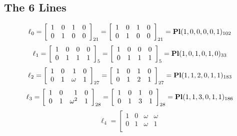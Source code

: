 \documentclass{article}
\begin{document}
{\subsection*{The 6 Lines}
$$
\ell_{0} = 
\left[
\begin{array}{*{4}{r}}
1 & 0 & 1 & 0\\
0 & 1 & 0 & 0\\
\end{array}
\right]
_{21}
=
\left[
\begin{array}{*{4}c}
1  & 0  & 1  & 0\\
0  & 1  & 0  & 0\\
\end{array}
\right]_{21}
={\rm\bf Pl}(1,0,0,0,0,1 )_{102}$$
$$
\ell_{1} = 
\left[
\begin{array}{*{4}{r}}
1 & 0 & 0 & 0\\
0 & 1 & 1 & 1\\
\end{array}
\right]
_{5}
=
\left[
\begin{array}{*{4}c}
1  & 0  & 0  & 0\\
0  & 1  & 1  & 1\\
\end{array}
\right]_{5}
={\rm\bf Pl}(1,0,1,0,1,0 )_{33}$$
$$
\ell_{2} = 
\left[
\begin{array}{*{4}{r}}
1 & 0 & 1 & 0\\
0 & 1 & \omega  & 1\\
\end{array}
\right]
_{27}
=
\left[
\begin{array}{*{4}c}
1  & 0  & 1  & 0\\
0  & 1  & 2  & 1\\
\end{array}
\right]_{27}
={\rm\bf Pl}(1,1,2,0,1,1 )_{183}$$
$$
\ell_{3} = 
\left[
\begin{array}{*{4}{r}}
1 & 0 & 1 & 0\\
0 & 1 & \omega^{2} & 1\\
\end{array}
\right]
_{28}
=
\left[
\begin{array}{*{4}c}
1  & 0  & 1  & 0\\
0  & 1  & 3  & 1\\
\end{array}
\right]_{28}
={\rm\bf Pl}(1,1,3,0,1,1 )_{186}$$
$$
\ell_{4} = 
\left[
\begin{array}{*{4}{r}}
1 & 0 & \omega  & \omega \\
0 & 1 & \omega  & 1\\

\end{array}$$}
\end{document}
